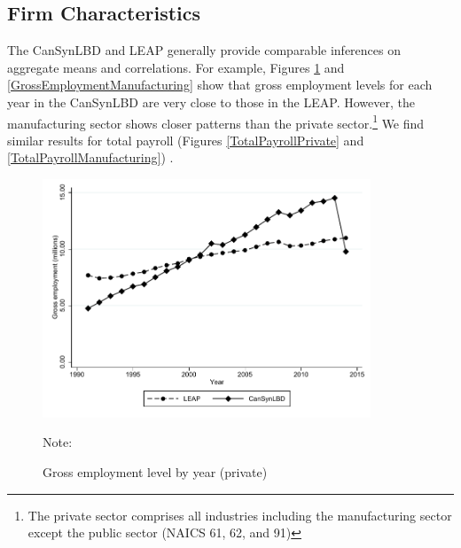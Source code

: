 \documentclass{article}
\begin{document}
\subsection{Firm Characteristics}

The CanSynLBD and LEAP generally provide comparable inferences on aggregate means and correlations. For example, Figures \ref{GrossEmploymentPrivate} and \ref{GrossEmploymentManufacturing} show that gross employment levels for each year in the CanSynLBD are very close to those in the LEAP. However, the manufacturing sector shows closer patterns than the private sector.\footnote{The private sector comprises all industries including the manufacturing sector except the public sector  (NAICS 61, 62, and 91)} We find similar results for total payroll (Figures \ref{TotalPayrollPrivate} and  \ref{TotalPayrollManufacturing}) .

 
\begin{figure} [H]
\centering
\caption{Gross employment level by year (private)} \label{GrossEmploymentPrivate}
\includegraphics[height=2.8in, width=.7\linewidth]{graphs/Gross_employment_level_by_year_private_bw.pdf} 
\begin{minipage}{0.85\textwidth}
{\footnotesize Note: \TableNote \par}
\end{minipage}
\end{figure}
\end{document}
